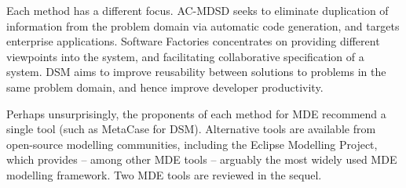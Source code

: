 Each method has a different focus. AC-MDSD seeks to eliminate duplication of information from the problem domain via automatic code generation, and targets enterprise applications. Software Factories concentrates on providing different viewpoints into the system, and facilitating collaborative specification of a system. DSM aims to improve reusability between solutions to problems in the same problem domain, and hence improve developer productivity.

Perhaps unsurprisingly, the proponents of each method for MDE recommend a single tool (such as MetaCase for DSM). Alternative tools are available from open-source modelling communities, including the Eclipse Modelling Project, which provides -- among other MDE tools -- arguably the most widely used MDE modelling framework. Two MDE tools are reviewed in the sequel.